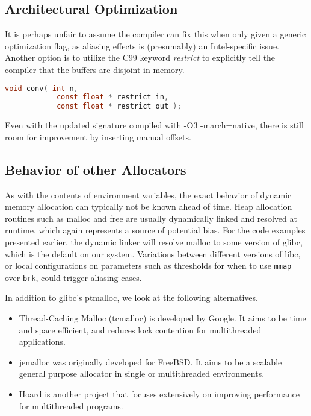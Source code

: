 \documentclass[a4paper,10pt,twocolumn,twoside]{article}
\begin{document}
{\subsection{Architectural Optimization}
It is perhaps unfair to assume the compiler can fix this when only given a generic optimization flag, as aliasing effects is (presumably) an Intel-specific issue.
Another option is to utilize the C99 keyword \emph{restrict} to explicitly tell the compiler that the buffers are disjoint in memory.

\begin{lstlisting}[language=C]
void conv( int n,
            const float * restrict in,
            const float * restrict out );
\end{lstlisting}

Even with the updated signature compiled with -O3 -march=native, there is still room for improvement by inserting manual offsets.


\subsection{Behavior of other Allocators}
As with the contents of environment variables, the exact behavior of dynamic memory allocation can typically not be known ahead of time.
Heap allocation routines such as malloc and free are usually dynamically linked and resolved at runtime, which again represents a source of potential bias.
For the code examples presented earlier, the dynamic linker will resolve malloc to some version of glibc, which is the default on our system.
Variations between different versions of libc, or local configurations on parameters such as thresholds for when to use \texttt{mmap} over \texttt{brk}, could trigger aliasing cases.

In addition to glibc's ptmalloc, we look at the following alternatives.
\begin{itemize}
 \item Thread-Caching Malloc (tcmalloc) is developed by Google. It aims to be time and space efficient, and reduces lock contention for multithreaded applications. \cite{TCMalloc}
 \item jemalloc was originally developed for FreeBSD. It aims to be a scalable general purpose allocator in single or multithreaded environments. \cite{JEMalloc}
 \item Hoard is another project that focuses extensively on improving performance for multithreaded programs. \cite{Berger:2000:Hoard}
\end{itemize}

}
\end{document}
